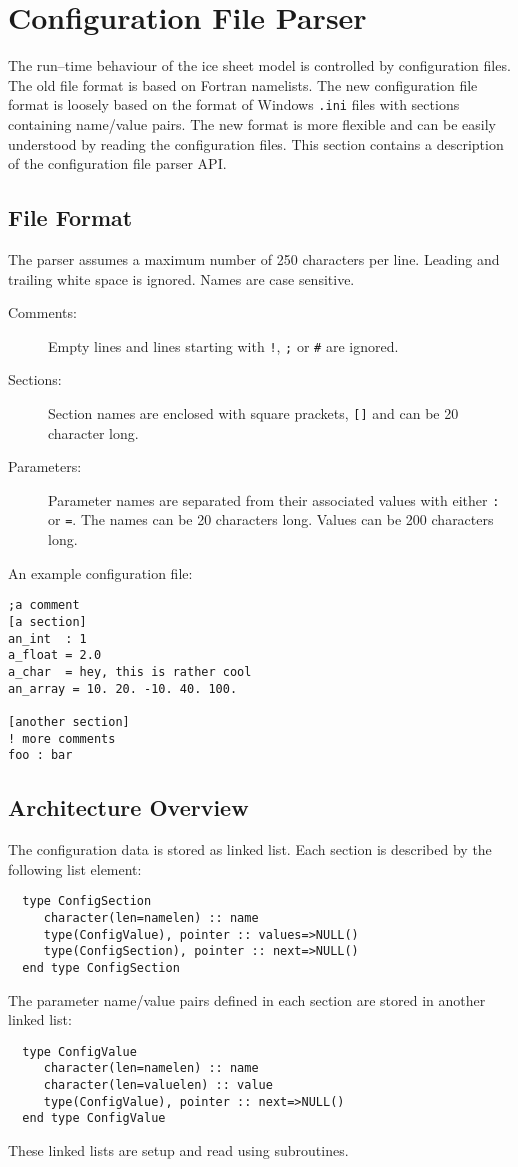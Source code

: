 \section{Configuration File Parser}\label{dg.sec.config_file}
The run--time behaviour of the ice sheet model is controlled by configuration files. The old file format is based on Fortran namelists. The new configuration file format is loosely based on the format of Windows \texttt{.ini} files with sections containing name/value pairs. The new format is more flexible and can be easily understood by reading the configuration files. This section contains a description of the configuration file parser API.

\subsection{File Format}
The parser assumes a maximum number of 250 characters per line. Leading and trailing white space is ignored. Names are case sensitive.
\begin{description}
\item[Comments:] Empty lines and lines starting with \texttt{!}, \texttt{;} or \texttt{\#} are ignored.
\item[Sections:] Section names are enclosed with square prackets, \texttt{[]} and can be 20 character long.
\item[Parameters:] Parameter names are separated from their associated values with either \texttt{:} or \texttt{=}. The names can be 20 characters long. Values can be 200 characters long.
\end{description}

An example configuration file:
\begin{verbatim}
;a comment
[a section]
an_int  : 1
a_float = 2.0
a_char  = hey, this is rather cool
an_array = 10. 20. -10. 40. 100.

[another section]
! more comments
foo : bar
\end{verbatim}

\subsection{Architecture Overview}
The configuration data is stored as linked list. Each section is described by the following list element:
\begin{verbatim}
  type ConfigSection
     character(len=namelen) :: name
     type(ConfigValue), pointer :: values=>NULL()
     type(ConfigSection), pointer :: next=>NULL()
  end type ConfigSection
\end{verbatim}
The parameter name/value pairs defined in each section are stored in another linked list:
\begin{verbatim}
  type ConfigValue
     character(len=namelen) :: name
     character(len=valuelen) :: value
     type(ConfigValue), pointer :: next=>NULL()
  end type ConfigValue
\end{verbatim}
These linked lists are setup and read using subroutines.


